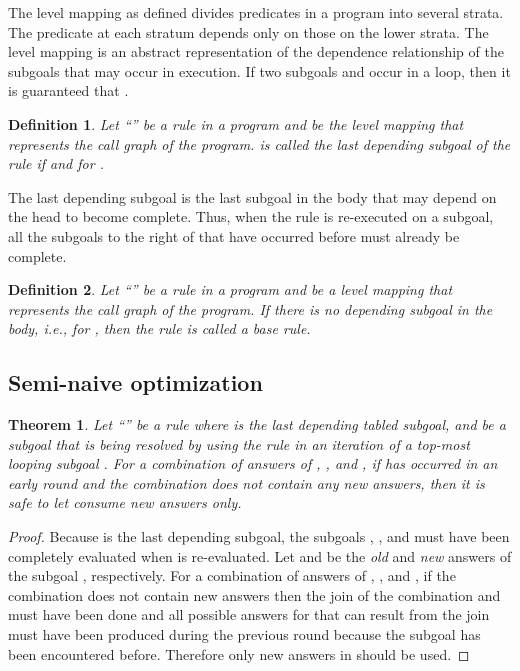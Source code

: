 \documentclass{tlp}
\newtheorem{definition}{Definition} \newtheorem{example}{Example} \newcommand{\pivot}[1]{\mathbin{\, {#1} \,}}
\begin{document}
The level mapping as defined divides predicates in a program into several strata. The predicate at each stratum depends only on those on the lower strata. The level mapping is an abstract representation of the dependence relationship of the subgoals that may occur in execution. If two subgoals  and  occur in a loop, then it is guaranteed that .

\begin{definition} {\rm Let ``'' be a rule in a program and  be the level mapping that represents the call graph of the program.  is called the {\it last depending subgoal} of the rule if  and  for .}
\end{definition}

The last depending subgoal  is the last subgoal in the body that may depend on the head to become complete. Thus, when the rule is re-executed on a subgoal, all the subgoals to the right of  that have occurred before must already be complete. 

\begin{definition} {\rm Let ``'' be a rule in a program and  be a level mapping that represents the call graph of the program. If there is no depending subgoal in the body, i.e.,  for , then the rule is called a {\it base rule}}.
\end{definition}

\subsection{Semi-naive optimization}
\newtheorem{theorem}{Theorem}
\begin{theorem}
Let ``'' be a rule where  is the last depending tabled subgoal, and  be a subgoal that is being resolved by using the rule in an iteration of a top-most looping subgoal . For a combination of answers of , , and , if  has occurred in an early round and the combination does not contain any new answers, then it is safe to let  consume new answers only. 
\end{theorem}

\begin{proof}
Because  is the last depending subgoal, the subgoals , , and  must have been completely evaluated when  is re-evaluated. Let  and  be the {\it old} and {\it new} answers of the subgoal , respectively. For a combination of answers of , , and , if the combination does not contain new answers then the join of the combination and  must have been done and all possible answers for  that can result from the join must have been produced during the previous round because the subgoal  has been encountered before. Therefore only new answers in  should be used.
\end{proof}
\end{document}
